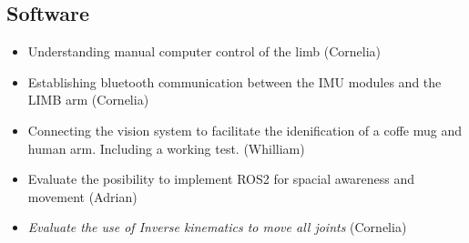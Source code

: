 \subsection*{Software}\nopagebreak
\begin{itemize}
  \item Understanding manual computer control of the limb (Cornelia)
  \item Establishing bluetooth communication between the IMU modules and the LIMB arm (Cornelia)
  \item Connecting the vision system to facilitate the idenification of a coffe mug and human arm. Including a working test. (Whilliam)
  \item Evaluate the posibility to implement ROS2 for spacial awareness and movement (Adrian)
  \item \textit{Evaluate the use of Inverse kinematics to move all joints} (Cornelia)
\end{itemize}

